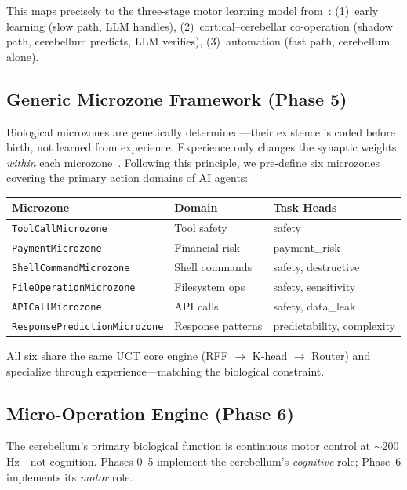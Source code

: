 \documentclass[11pt,a4paper]{article}
\begin{document}
This maps precisely to the three-stage motor learning model from~\citet{tsay2025cerebellum}: (1)~early learning (slow path, LLM handles), (2)~cortical--cerebellar co-operation (shadow path, cerebellum predicts, LLM verifies), (3)~automation (fast path, cerebellum alone).

\subsection{Generic Microzone Framework (Phase 5)}\label{sec:microzones_generic}

Biological microzones are genetically determined---their existence is coded before birth, not learned from experience.
Experience only changes the synaptic weights \emph{within} each microzone~\citep{apps2005anatomical}.
Following this principle, we pre-define six microzones covering the primary action domains of AI agents:

\begin{center}
\begin{tabular}{lll}
\toprule
Microzone & Domain & Task Heads \\
\midrule
\texttt{ToolCallMicrozone} & Tool safety & safety \\
\texttt{PaymentMicrozone} & Financial risk & payment\_risk \\
\texttt{ShellCommandMicrozone} & Shell commands & safety, destructive \\
\texttt{FileOperationMicrozone} & Filesystem ops & safety, sensitivity \\
\texttt{APICallMicrozone} & API calls & safety, data\_leak \\
\texttt{ResponsePredictionMicrozone} & Response patterns & predictability, complexity \\
\bottomrule
\end{tabular}
\end{center}

All six share the same UCT core engine (RFF $\to$ K-head $\to$ Router) and specialize through experience---matching the biological constraint.

\subsection{Micro-Operation Engine (Phase 6)}\label{sec:micro_ops}

The cerebellum's primary biological function is continuous motor control at $\sim$200\,Hz---not cognition.
Phases 0--5 implement the cerebellum's \emph{cognitive} role; Phase~6 implements its \emph{motor} role.
\end{document}
